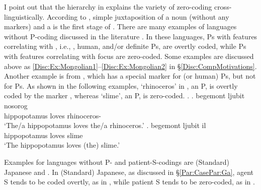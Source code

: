 I point out that the hierarchy in \Last explains the variety of zero-coding cross-linguistically.
According to ,
simple juxtaposition of a noun (without any markers) and a  is the first stage of .
There are many examples of languages without P-coding discussed in the literature
\cite[]{comrie79,comrie83,croft03,aissen03,haspelmath08}.
In these languages,
Ps with features correlating with ,
i.e.,  , human, and{\slash}or definite Ps,
are overtly coded,
while Ps with features correlating with focus
are zero-coded.
Some examples are discussed above as \ref{Disc:Ex:Mongolian1}--\ref{Disc:Ex:Mongolian2} in \S \ref{Disc:CompMotivations}.
Another example is from ,
which has a special marker for  (or human) Ps,
but not for  Ps.
As shown in the following examples,
 `rhinoceros' in \Next[a], an  P,
is overtly coded by the  marker ,
whereas  `slime', an  P,
is zero-coded.
%
\ex.
 \ag. begemont ljubit nosorog \\
      hippopotamus loves rhinoceros- \\
      `The/a hippopotamus loves the/a rhinoceros.'
 \bg. begemont ljubit il \\
      hippopotamus loves slime \\
      `The hippopotamus loves (the) slime.'

Examples for languages without P- and patient-S-codings are (Standard) Japanese and .
In (Standard) Japanese,
as discussed in \S \ref{Par:CasePar:Ga},
agent S tends to be coded overtly, as in \Next[a],
while patient S tends to be zero-coded, as in \Next[b-c]
\cite[93]{kageyama93}.

